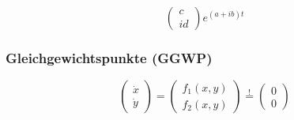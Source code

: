 \begin{itemize}
\begin{enumerate}
\begin{itemize}
$$\begin{pmatrix}
                                c\\id
                            \end{pmatrix}
                            e^{(a+ib)t}
                        $$

                \end{itemize}

            \end{enumerate}
            

    \end{itemize}
    
    \subsubsection{Gleichgewichtspunkte (GGWP)}
        $$
            \begin{pmatrix}
                \dot{x}\\ \dot{y}
            \end{pmatrix}
            =
            \begin{pmatrix}
                f_1(x,y)\\ f_2(x,y)
            \end{pmatrix}
            \overset{!}{=} 
            \begin{pmatrix}
                0\\0
            \end{pmatrix}
        $$
